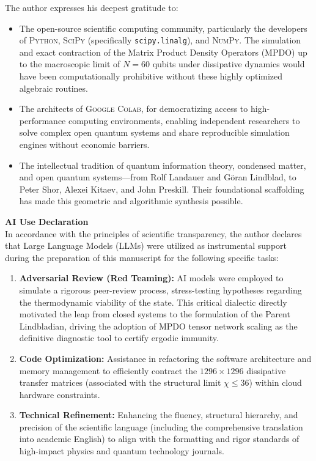 \documentclass[reprint,aps,pra,superscriptaddress,nofootinbib]{revtex4-2}
\theoremstyle{plain}
\theoremstyle{definition}
\theoremstyle{remark}
\begin{document}
\begin{acknowledgments}
The author expresses his deepest gratitude to:

\begin{itemize}
    \item The open-source scientific computing community, particularly the developers of \textsc{Python}, \textsc{SciPy} (specifically \texttt{scipy.linalg}), and \textsc{NumPy}. The simulation and exact contraction of the Matrix Product Density Operators (MPDO) up to the macroscopic limit of $N=60$ qubits under dissipative dynamics would have been computationally prohibitive without these highly optimized algebraic routines.
    \item The architects of \textsc{Google Colab}, for democratizing access to high-performance computing environments, enabling independent researchers to solve complex open quantum systems and share reproducible simulation engines without economic barriers.
    \item The intellectual tradition of quantum information theory, condensed matter, and open quantum systems—from Rolf Landauer and Göran Lindblad, to Peter Shor, Alexei Kitaev, and John Preskill. Their foundational scaffolding has made this geometric and algorithmic synthesis possible.
\end{itemize}

\vspace{0.3cm}
\noindent \textbf{AI Use Declaration} \\
In accordance with the principles of scientific transparency, the author declares that Large Language Models (LLMs) were utilized as instrumental support during the preparation of this manuscript for the following specific tasks:

\begin{enumerate}
    \item \textbf{Adversarial Review (Red Teaming):} AI models were employed to simulate a rigorous peer-review process, stress-testing hypotheses regarding the thermodynamic viability of the state. This critical dialectic directly motivated the leap from closed systems to the formulation of the Parent Lindbladian, driving the adoption of MPDO tensor network scaling as the definitive diagnostic tool to certify ergodic immunity.
    \item \textbf{Code Optimization:} Assistance in refactoring the software architecture and memory management to efficiently contract the $1296 \times 1296$ dissipative transfer matrices (associated with the structural limit $\chi \le 36$) within cloud hardware constraints.
    \item \textbf{Technical Refinement:} Enhancing the fluency, structural hierarchy, and precision of the scientific language (including the comprehensive translation into academic English) to align with the formatting and rigor standards of high-impact physics and quantum technology journals.
\end{enumerate}


\end{acknowledgments}
\end{document}
